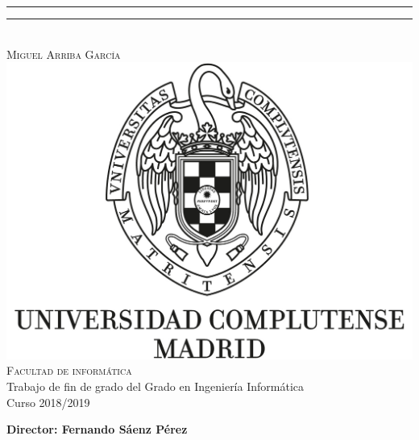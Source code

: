 \begin{center}
    \rule[0.5ex]{\linewidth}{1pt}\vspace*{-\baselineskip}\vspace{4.2pt}
    \rule[0.5ex]{\linewidth}{2pt}\\
    \vspace{13mm}
    {\large\textsc{Miguel Arriba García}}\\ %
    \vspace{11mm}
    \includegraphics[scale=0.3]{img/logo_UCM.jpg}\\ %
    \vspace{6mm}
    {
    \textsc{\large{Facultad de informática}}\\
    \vspace{5mm}
    \large{Trabajo de fin de grado del Grado en Ingeniería Informática}\\
    \vspace{2mm}
    Curso 2018/2019}\\ %
    \vspace{15mm}
    \begin{minipage}{10cm}
    \begin{center}
      \textbf{\large Director: Fernando Sáenz Pérez}\\
      \vspace{2mm}
    \end{center}
    \vspace{4mm}
    
    \end{minipage}\\
    \vspace{12mm}
\end{center}